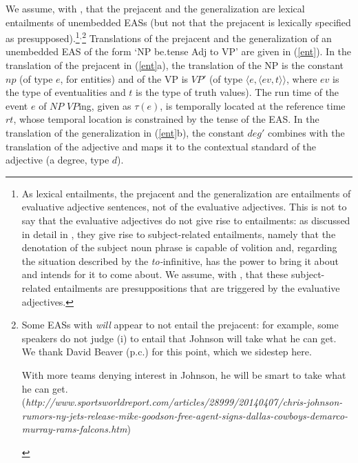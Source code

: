 \documentclass[11pt,fleqn]{article}
\newcommand{\6}{\mbox{$[\hspace*{-.6mm}[$}}
\newcommand{\9}{\mbox{$]\hspace*{-.6mm}]$}}
\begin{document}
We assume, with \citealt{barker02}, that the prejacent and the generalization are lexical entailments of unembedded EASs (but not that the prejacent is lexically specified as presupposed).\footnote{\label{sre}As lexical entailments, the prejacent and the generalization are entailments of evaluative adjective sentences, not of the evaluative adjectives. This is not to say that the evaluative adjectives do not give rise to entailments: as discussed in detail in \citealt[\S4.2]{barker02}, they give rise to subject-related entailments, namely that the denotation of the subject noun phrase is capable of volition and, regarding the situation described by the {\em to-}infinitive, has the power to bring it about and intends for it to come about.  We assume, with \citet{barker02}, that these subject-related entailments are presuppositions that are triggered by the evaluative adjectives.}$^{,}$\footnote{Some EASs with {\em will} appear to not entail the prejacent: for example, some speakers do not judge (i) to entail that Johnson will take what he can get. We thank David Beaver (p.c.) for this point, which we sidestep here.
\begin{exe}
 With more teams denying interest in Johnson, he will be smart
to take what he can get. \\ ({\em http://www.sportsworldreport.com/articles/28999/20140407/chris-johnson-rumors-ny-jets-release-mike-goodson-free-agent-signs-dallas-cowboys-demarco-murray-rams-falcons.htm})
\end{exe}} 
 Translations of the prejacent and the generalization of an unembedded EAS of the form `NP be{\sc .tense} Adj to VP' are given in (\ref{ent}). In the translation of the prejacent in (\ref{ent}a), the translation of the NP is the constant $np$ (of type $e$, for entities) and of the VP is $VP'$ (of type $\langle e, \langle ev,  t\rangle \rangle$, where $ev$ is the type of eventualities and $t$ is the type of truth values). The run time of the event $e$ of $NP$ $VP$ing, given as $\tau(e)$, is temporally located at the reference time $rt$, whose temporal location is constrained by the tense of the EAS. In the translation of the generalization in (\ref{ent}b), the constant $deg'$ combines with the translation of the adjective and maps it to the contextual standard of the adjective (a degree, type $d$). 
\end{document}
